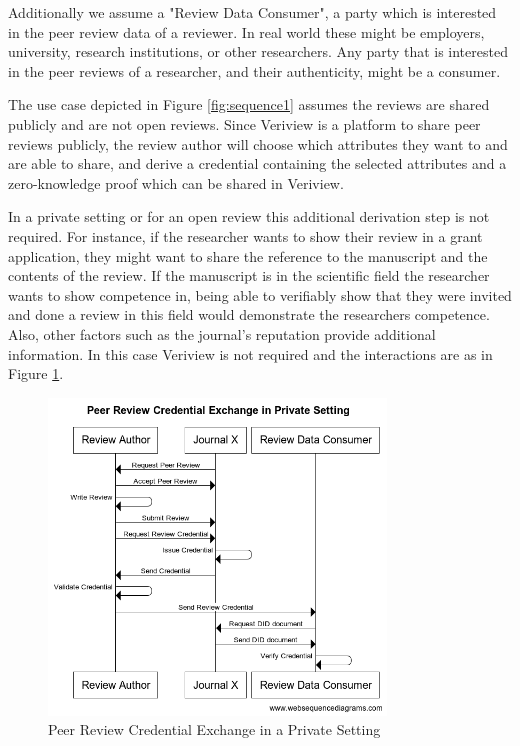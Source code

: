Additionally we assume a "Review Data Consumer", a party which is interested in the peer review data of a reviewer. In real world these might be employers, university, research institutions, or other researchers. Any party that is interested in the peer reviews of a researcher, and their authenticity, might be a consumer. 

The use case depicted in Figure \ref{fig:sequence1} assumes the reviews are shared publicly and are not open reviews. Since Veriview is a platform to share peer reviews publicly, the review author will choose which attributes they want to and are able to share, and derive a credential containing the selected attributes and a zero-knowledge proof which can be shared in Veriview. 

In a private setting or for an open review this additional derivation step is not required. For instance, if the researcher wants to show their review in a grant application, they might want to share the reference to the manuscript and the contents of the review. If the manuscript is in the scientific field the researcher wants to show competence in, being able to verifiably show that they were invited and done a review in this field  would demonstrate the researchers competence. Also, other factors such as the journal's reputation provide additional information. In this case Veriview is not required and the interactions are as in Figure \ref{fig:sequencePrivate}.

\begin{figure}[htpb]
  \centering
  \includegraphics[width=0.8\textwidth]{figures/sequencePrivate.png}
  \caption{Peer Review Credential Exchange in a Private Setting} \label{fig:sequencePrivate}
\end{figure}

